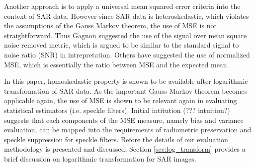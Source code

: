 \documentclass[journal]{IEEEtran}
\begin{document}

Another approach is to apply a universal mean squared error criteria into the context of SAR data. 
However since SAR data is heteroskedastic, which violates the assumptions of the Gauss Markov theorem, 
	the use of MSE is not straightforward. 
Thus Gagnon \cite{Gagnon_SPIEProc_1997} suggested the use of the signal over mean square noise removed metric, 
	which is argued to be similar to the standard signal to noise ratio (SNR) in intrepretation. 
Others have suggested the use of normalized MSE, which is essentially the ratio between MSE and the expected mean.


In this paper, homoskedastic property is shown to be available after logarithmic transformation of SAR data.
As the important Gauss Markov theorem becomes applicable again, 
	the use of MSE is shown to be relevant again in evaluating statistical estimators (i.e. speckle filters).
Initial intitution (??? intuition?)
	suggests that each components of the MSE measure, 
	namely bias and variance evaluation, can be mapped into 
	the requirements of radiometric preservation and speckle suppression for speckle filters.
Before the details of our evaluation methodology is presented and discussed, 
	Section \ref{sec:log_transform} provides a brief discussion on logarithmic transformation for SAR images.
\end{document}
